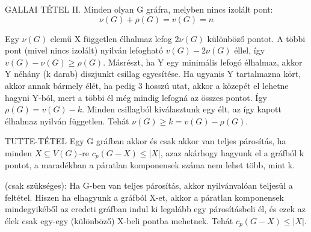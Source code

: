 \begin{tetel}{GALLAI TÉTEL II.}
Minden olyan G gráfra, melyben nincs izolált pont:
$$\nu(G) + \rho(G) = v(G) = n$$
\end{tetel}

\begin{bizonyitas}{}
Egy $\nu(G)$ elemű X független élhalmaz lefog $2\nu(G)$ különböző pontot. A többi pont (mivel nincs izolált) nyilván lefogható $v(G) - 2\nu(G)$ éllel, így $v(G) - \nu(G) \geq \rho(G)$. Másrészt, ha Y egy minimális lefogó élhalmaz, akkor Y néhány (k darab) diszjunkt csillag egyesítése. Ha ugyanis Y tartalmazna kört, akkor annak bármely élét, ha pedig 3 hosszú utat, akkor a közepét el lehetne hagyni Y-ból, mert a többi él még mindig lefogná az összes pontot. Így $\rho(G) = v(G) - k$. Minden csillagból kiválasztunk egy élt, az így kapott élhalmaz nyilván független. Tehát $\nu(G) \geq k = v(G) - \rho(G)$.
\end{bizonyitas}

\begin{tetel}{TUTTE-TÉTEL}
Egy G gráfban akkor és csak akkor van teljes párosítás, ha minden $X \subseteq V(G)$-re $c_p(G - X)\leq |X|$, azaz akárhogy hagyunk el a gráfból k pontot, a maradékban a páratlan komponensek száma nem lehet több, mint k.
\end{tetel}

\begin{bizonyitas}{}
(csak szükséges): Ha G-ben van teljes párosítás, akkor nyilvánvalóan teljesül a feltétel. Hiszen ha elhagyunk a gráfból X-et, akkor a páratlan komponensek mindegyikéből az eredeti gráfban indul ki legalább egy párosításbeli él, és ezek az élek csak egy-egy (különböző) X-beli pontba mehetnek. Tehát $c_p(G - X) \leq |X|$.
\end{bizonyitas}

